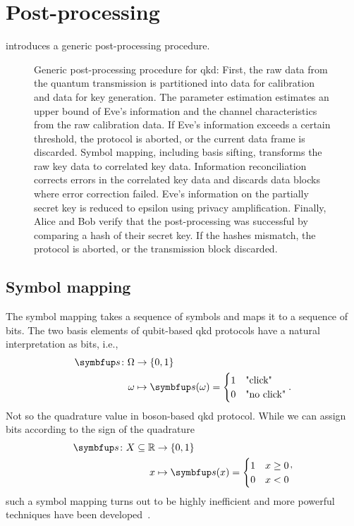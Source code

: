 \section{Post-processing}

 introduces a generic post-processing procedure.
\begin{figure}[htb]
	\centering
	
	\caption{Generic post-processing procedure for \gls{qkd}: First, the raw data from the quantum transmission is partitioned into data for calibration and data for key generation. The parameter estimation estimates an upper bound of Eve's information and the channel characteristics from the raw calibration data. If Eve's information exceeds a certain threshold, the protocol is aborted, or the current data frame is discarded. Symbol mapping, including basis sifting, transforms the raw key data to correlated key data. Information reconciliation corrects errors in the correlated key data and discards data blocks where error correction failed. Eve's information on the partially secret key is reduced to epsilon using privacy amplification. Finally, Alice and Bob verify that the post-processing was successful by comparing a hash of their secret key. If the hashes mismatch, the protocol is aborted, or the transmission block discarded.}\label{fig:post_processing}
\end{figure}

\FloatBarrier
\subsection{Symbol mapping}

The symbol mapping takes a sequence of symbols and maps it to a sequence of bits.
The two basis elements of qubit-based \gls{qkd} protocols have a natural interpretation as bits, i.e.,
\begin{equation}
	\begin{split}
		\vb{s}\colon\Omega&\to\{0,1\} \\
		\omega &\mapsto \vb{s}(\omega)
		=
		\begin{cases}
			1 & \text{"click"} \\
			0 & \text{"no click"}
		\end{cases}
		.
	\end{split}
\end{equation}
Not so the quadrature value in boson-based \gls{qkd} protocol.
While we can assign bits according to the sign of the quadrature
\begin{equation}
	\begin{split}
		\vb{s}\colon X\subseteq\mathbb{R}&\to\{0,1\} \\
		x &\mapsto \vb{s}(x)
		=
		\begin{cases}
			1 & x\geq0 \\
			0 & x<0
		\end{cases}
	\end{split}
	,
\end{equation}
such a symbol mapping turns out to be highly inefficient and more powerful techniques have been developed~\cite{VanAsche2004,Leverrier2008}.

